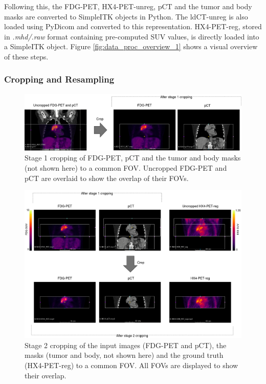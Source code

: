 Following this, the FDG-PET, HX4-PET-unreg, pCT and the tumor and body masks are converted to SimpleITK objects in Python. The ldCT-unreg is also loaded using PyDicom and converted to this representation. HX4-PET-reg, stored in \textit{.mhd/.raw} format containing pre-computed SUV values, is directly loaded into a SimpleITK object. Figure \ref{fig:data_proc_overview_1} shows a visual overview of these steps.


\subsubsection{Cropping and Resampling}
\begin{figure}[h!]
    \centering
    \includegraphics[width=\linewidth]{figures/Data/fdgpet_pct_crop1/N010-FDG_PET_pCT-uncropped_crop1.png}
    \caption{Stage 1 cropping of FDG-PET, pCT and the tumor and body masks (not shown here) to a common FOV. Uncropped FDG-PET and pCT are overlaid to show the overlap of their FOVs.}
    \label{fig:fdg_pet_pct_crop1}
\end{figure}

\begin{figure}[h!]
    \centering
    \includegraphics[width=\linewidth]{figures/Data/fdgpet_pct_fx4petreg_crop2/N010-fdgpet_pct_hx4petreg-uncropped_crop2.png}
    \caption{Stage 2 cropping of the input images (FDG-PET and pCT), the masks (tumor and body, not shown here) and the ground truth (HX4-PET-reg) to a common FOV. All FOVs are displayed to show their overlap.}
    \label{fig:fdgpet_pct_hx4petreg_crop2}
\end{figure}


